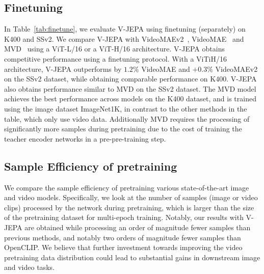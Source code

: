 \documentclass[twocolumn]{fairmeta}
\newcommand{\putalg}{{\small V-JEPA}\xspace}
\theoremstyle{plain}
\theoremstyle{definition}
\theoremstyle{remark}
\begin{document}
\subsection{Finetuning} \label{sec:app_finetune}
In Table~\ref{tab:finetune}, we evaluate \putalg using finetuning (separately) on K400 and SSv2. We compare \putalg  with VideoMAEv2~\citep{wang2023videomae}, VideoMAE~\citep{tong2022videomae} and MVD~\citep{wang2023masked} using a ViT-L/16 or a ViT-H/16 architecture. \putalg obtains competitive performance using a finetuning protocol.
With a ViTiH/16 architecture, \putalg outperforms by $1.2\%$ VideoMAE and $+0.3\%$ VideoMAEv2 on the SSv2 dataset, while obtaining comparable performance on K400. 
\putalg also obtains performance similar to MVD on the SSv2 dataset.
The MVD model achieves the best performance across models on the K400 dataset, and is trained using the image dataset ImageNet1K, in contrast to the other methods in the table, which only use video data.
Additionally MVD requires the processing of significantly more samples during pretraining due to the cost of training the teacher encoder networks in a pre-pre-training step.


\subsection{Sample Efficiency of pretraining}
\label{app:samples}

We compare the sample efficiency of pretraining various state-of-the-art image and video models.
Specifically, we look at the number of samples (image or video clips) processed by the network during pretraining, which is larger than the size of the pretraining dataset for multi-epoch training.
Notably, our results with \putalg are obtained while processing an order of magnitude fewer samples than previous methods, and notably two orders of magnitude fewer samples than OpenCLIP.
We believe that further investment towards improving the video pretraining data distribution could lead to substantial gains in downstream image and video tasks.
\end{document}
